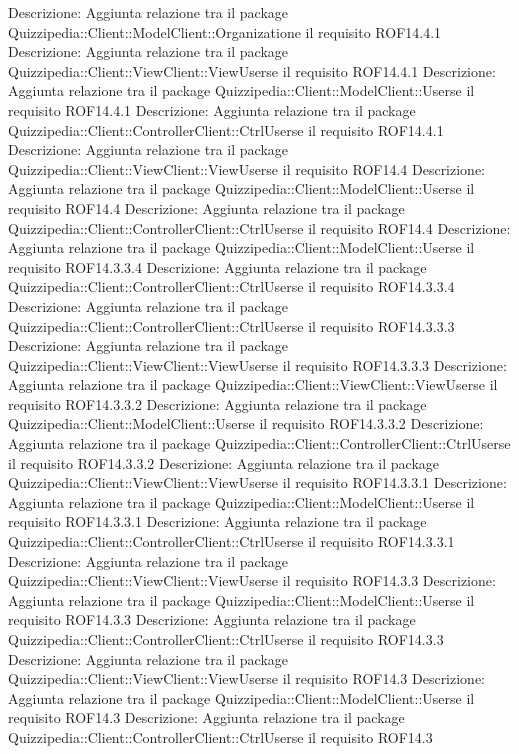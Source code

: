 Descrizione: Aggiunta relazione tra il package Quizzipedia::Client::ModelClient::Organizatione il requisito ROF14.4.1 
Descrizione: Aggiunta relazione tra il package Quizzipedia::Client::ViewClient::ViewUserse il requisito ROF14.4.1 
Descrizione: Aggiunta relazione tra il package Quizzipedia::Client::ModelClient::Userse il requisito ROF14.4.1 
Descrizione: Aggiunta relazione tra il package Quizzipedia::Client::ControllerClient::CtrlUserse il requisito ROF14.4.1 
Descrizione: Aggiunta relazione tra il package Quizzipedia::Client::ViewClient::ViewUserse il requisito ROF14.4 
Descrizione: Aggiunta relazione tra il package Quizzipedia::Client::ModelClient::Userse il requisito ROF14.4 
Descrizione: Aggiunta relazione tra il package Quizzipedia::Client::ControllerClient::CtrlUserse il requisito ROF14.4 
Descrizione: Aggiunta relazione tra il package Quizzipedia::Client::ModelClient::Userse il requisito ROF14.3.3.4 
Descrizione: Aggiunta relazione tra il package Quizzipedia::Client::ControllerClient::CtrlUserse il requisito ROF14.3.3.4 
Descrizione: Aggiunta relazione tra il package Quizzipedia::Client::ControllerClient::CtrlUserse il requisito ROF14.3.3.3 
Descrizione: Aggiunta relazione tra il package Quizzipedia::Client::ViewClient::ViewUserse il requisito ROF14.3.3.3 
Descrizione: Aggiunta relazione tra il package Quizzipedia::Client::ViewClient::ViewUserse il requisito ROF14.3.3.2 
Descrizione: Aggiunta relazione tra il package Quizzipedia::Client::ModelClient::Userse il requisito ROF14.3.3.2 
Descrizione: Aggiunta relazione tra il package Quizzipedia::Client::ControllerClient::CtrlUserse il requisito ROF14.3.3.2 
Descrizione: Aggiunta relazione tra il package Quizzipedia::Client::ViewClient::ViewUserse il requisito ROF14.3.3.1 
Descrizione: Aggiunta relazione tra il package Quizzipedia::Client::ModelClient::Userse il requisito ROF14.3.3.1 
Descrizione: Aggiunta relazione tra il package Quizzipedia::Client::ControllerClient::CtrlUserse il requisito ROF14.3.3.1 
Descrizione: Aggiunta relazione tra il package Quizzipedia::Client::ViewClient::ViewUserse il requisito ROF14.3.3 
Descrizione: Aggiunta relazione tra il package Quizzipedia::Client::ModelClient::Userse il requisito ROF14.3.3 
Descrizione: Aggiunta relazione tra il package Quizzipedia::Client::ControllerClient::CtrlUserse il requisito ROF14.3.3 
Descrizione: Aggiunta relazione tra il package Quizzipedia::Client::ViewClient::ViewUserse il requisito ROF14.3 
Descrizione: Aggiunta relazione tra il package Quizzipedia::Client::ModelClient::Userse il requisito ROF14.3 
Descrizione: Aggiunta relazione tra il package Quizzipedia::Client::ControllerClient::CtrlUserse il requisito ROF14.3 
